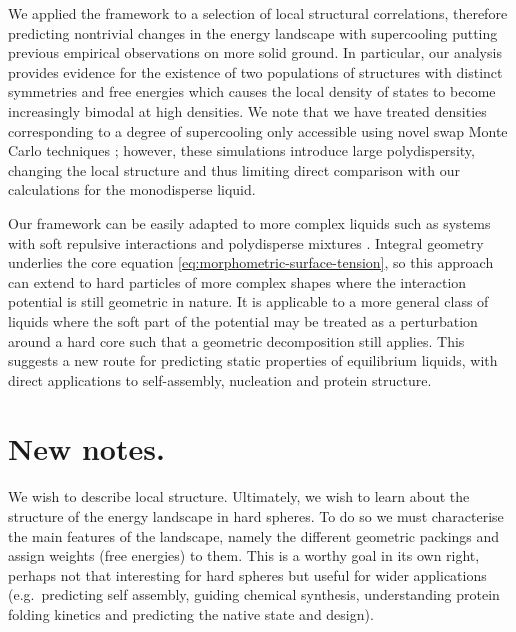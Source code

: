 \documentclass[11pt,twoside]{report}
\begin{document}
We applied the framework to a selection of local structural correlations, therefore predicting nontrivial changes in the energy landscape with supercooling putting previous empirical observations on more solid ground.
In particular, our analysis provides evidence for the existence of two populations of structures with distinct symmetries and free energies which causes the local density of states to become increasingly bimodal at high densities.
We note that we have treated densities corresponding to a degree of supercooling only accessible using novel swap Monte Carlo techniques \cite{Berthier2016}; however, these simulations introduce large polydispersity, changing the local structure \cite{Coslovich2018} and thus limiting direct comparison with our calculations for the monodisperse liquid.

Our framework can be easily adapted to more complex liquids such as systems with soft repulsive interactions and polydisperse mixtures \cite{Kodama2011}.
Integral geometry underlies the core equation \eqref{eq:morphometric-surface-tension}, so this approach can extend to hard particles of more complex shapes where the interaction potential is still geometric in nature.
It is applicable to a more general class of liquids where the soft part of the potential may be treated as a perturbation around a hard core \cite{Hansen2013} such that a geometric decomposition still applies.
This suggests a new route for predicting static properties of equilibrium liquids, with direct applications to self-assembly, nucleation and protein structure.

\section{New notes.}

We wish to describe local structure.
Ultimately, we wish to learn about the structure of the energy landscape in hard spheres.
To do so we must characterise the main features of the landscape, namely the different geometric packings and assign weights (free energies) to them.
This is a worthy goal in its own right, perhaps not that interesting for hard spheres but useful for wider applications (e.g.\ predicting self assembly, guiding chemical synthesis, understanding protein folding kinetics and predicting the native state and design).
\end{document}

